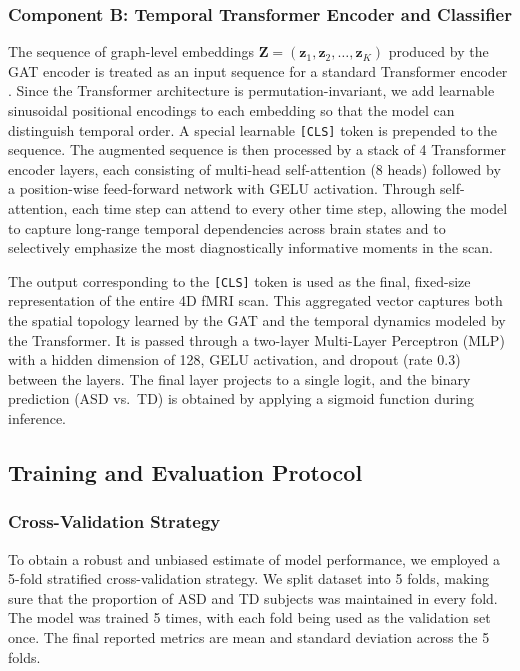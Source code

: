 \documentclass[10pt]{article}
\begin{document}
\subsubsection{Component B: Temporal Transformer Encoder and Classifier}
The sequence of graph-level embeddings $\mathbf{Z} = (\mathbf{z}_1, \mathbf{z}_2, \ldots, \mathbf{z}_K)$ produced by the GAT encoder is treated as an input sequence for a standard Transformer encoder \parencite{vaswani2017attention}. Since the Transformer architecture is permutation-invariant, we add learnable sinusoidal positional encodings to each embedding so that the model can distinguish temporal order. A special learnable \texttt{[CLS]} token is prepended to the sequence. The augmented sequence is then processed by a stack of 4 Transformer encoder layers, each consisting of multi-head self-attention (8 heads) followed by a position-wise feed-forward network with GELU activation. Through self-attention, each time step can attend to every other time step, allowing the model to capture long-range temporal dependencies across brain states and to selectively emphasize the most diagnostically informative moments in the scan.

The output corresponding to the \texttt{[CLS]} token is used as the final, fixed-size representation of the entire 4D fMRI scan. This aggregated vector captures both the spatial topology learned by the GAT and the temporal dynamics modeled by the Transformer. It is passed through a two-layer Multi-Layer Perceptron (MLP) with a hidden dimension of 128, GELU activation, and dropout (rate 0.3) between the layers. The final layer projects to a single logit, and the binary prediction (ASD vs.\ TD) is obtained by applying a sigmoid function during inference.

\subsection{Training and Evaluation Protocol}
\subsubsection{Cross-Validation Strategy}
To obtain a robust and unbiased estimate of model performance, we employed a 5-fold stratified cross-validation strategy. We split dataset into 5 folds, making sure that the proportion of ASD and TD subjects was maintained in every fold. The model was trained 5 times, with each fold being used as the validation set once. The final reported metrics are mean and standard deviation across the 5 folds.
\end{document}
